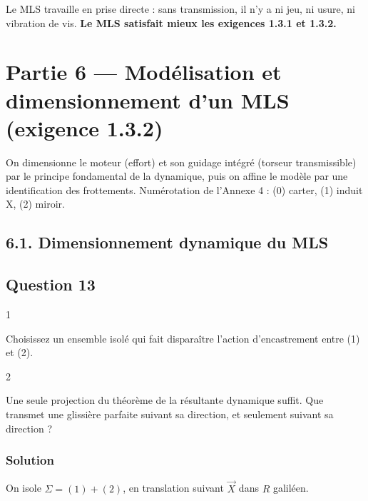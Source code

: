 \documentclass[11pt,a4paper]{article}
\begin{document}
Le MLS travaille en prise directe : sans transmission, il n'y a ni jeu, ni usure, ni vibration de vis. \textbf{Le MLS satisfait mieux les exigences 1.3.1 et 1.3.2.}

\hypertarget{partie-6-moduxe9lisation-et-dimensionnement-dun-mls-exigence-1.3.2}{%
\section{Partie 6 --- Modélisation et dimensionnement d'un MLS (exigence 1.3.2)}\label{partie-6-moduxe9lisation-et-dimensionnement-dun-mls-exigence-1.3.2}}

On dimensionne le moteur (effort) et son guidage intégré (torseur transmissible) par le principe fondamental de la dynamique, puis on affine le modèle par une identification des frottements. Numérotation de l'Annexe 4 : (0) carter, (1) induit X, (2) miroir.

\hypertarget{dimensionnement-dynamique-du-mls}{%
\subsection{6.1. Dimensionnement dynamique du MLS}\label{dimensionnement-dynamique-du-mls}}

\hypertarget{question-13}{%
\subsection{Question 13}\label{question-13}}

\begin{indication}{1}

Choisissez un ensemble isolé qui fait disparaître l'action d'encastrement entre (1) et (2).

\end{indication}

\begin{indication}{2}

Une seule projection du théorème de la résultante dynamique suffit. Que transmet une glissière parfaite suivant sa direction, et seulement suivant sa direction ?

\end{indication}

\hypertarget{solution-12}{%
\subsubsection{Solution}\label{solution-12}}

On isole \(\Sigma = (1)+(2)\), en translation suivant \(\vec X\) dans \(R\) galiléen.
\end{document}
